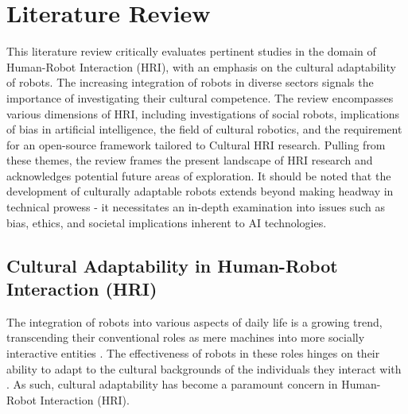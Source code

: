 
\chapter{Literature Review}

This literature review critically evaluates pertinent studies in the domain of Human-Robot Interaction (HRI), with an emphasis on the cultural adaptability of robots. The increasing integration of robots in diverse sectors signals the importance of investigating their cultural competence. The review encompasses various dimensions of HRI, including investigations of social robots, implications of bias in artificial intelligence, the field of cultural robotics, and the requirement for an open-source framework tailored to Cultural HRI research. Pulling from these themes, the review frames the present landscape of HRI research and acknowledges potential future areas of exploration. It should be noted that the development of culturally adaptable robots extends beyond making headway in technical prowess - it necessitates an in-depth examination into issues such as bias, ethics, and societal implications inherent to AI technologies.

\section{Cultural Adaptability in Human-Robot Interaction (HRI)}
The integration of robots into various aspects of daily life is a growing trend, transcending their conventional roles as mere machines into more socially interactive entities \cite{soriano2022}. The effectiveness of robots in these roles hinges on their ability to adapt to the cultural backgrounds of the individuals they interact with \cite{lim2020}. As such, cultural adaptability has become a paramount concern in Human-Robot Interaction (HRI).


